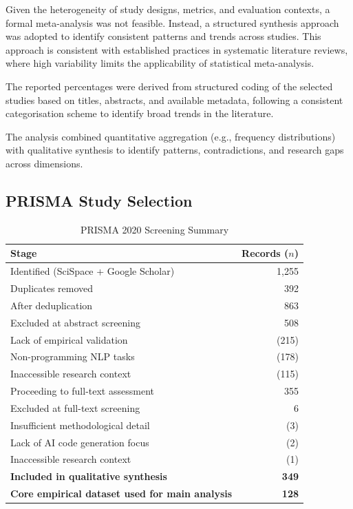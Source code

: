 \documentclass[conference]{IEEEtran}
\begin{document}
Given the heterogeneity of study designs, metrics, and evaluation contexts, a formal meta-analysis was not feasible. Instead, a structured synthesis approach was adopted to identify consistent patterns and trends across studies. This approach is consistent with established practices in systematic literature reviews, where high variability limits the applicability of statistical meta-analysis.

The reported percentages were derived from structured coding of the selected studies based on titles, abstracts, and available metadata, following a consistent categorisation scheme to identify broad trends in the literature.

The analysis combined quantitative aggregation (e.g., frequency distributions) with qualitative synthesis to identify patterns, contradictions, and research gaps across dimensions.

\subsection{PRISMA Study Selection}

\begin{table}[h]
\centering
\caption{PRISMA 2020 Screening Summary}
\label{tab:prisma_summary}
\begin{tabular}{l r}
\hline
\textbf{Stage} & \textbf{Records ($n$)} \\
\hline
Identified (SciSpace + Google Scholar) & 1,255 \\
Duplicates removed & 392 \\
After deduplication & 863 \\
Excluded at abstract screening & 508 \\
\quad Lack of empirical validation & (215) \\
\quad Non-programming NLP tasks & (178) \\
\quad Inaccessible research context & (115) \\
Proceeding to full-text assessment & 355 \\
Excluded at full-text screening & 6 \\
\quad Insufficient methodological detail & (3) \\
\quad Lack of AI code generation focus & (2) \\
\quad Inaccessible research context & (1) \\
\textbf{Included in qualitative synthesis} & \textbf{349} \\
\textbf{Core empirical dataset used for main analysis} & \textbf{128} \\
\hline
\end{tabular}
\end{table}
\end{document}
